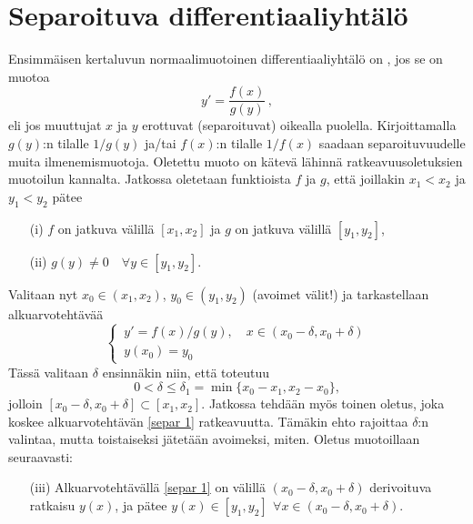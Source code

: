 \section{Separoituva differentiaaliyhtälö} \label{separoituva DY}
\alku
{}

Ensimmäisen kertaluvun normaalimuotoinen differentiaaliyhtälö on , jos se on
muotoa
\[
y'=\frac{f(x)}{g(y)}\,,
\]
eli jos muuttujat $x$ ja $y$ erottuvat (separoituvat) oikealla puolella. Kirjoittamalla $g(y)$:n
tilalle $1/g(y)$ ja/tai $f(x)$:n tilalle $1/f(x)$ saadaan separoituvuudelle muita 
ilmenemismuotoja. Oletettu muoto on kätevä lähinnä ratkeavuusoletuksien muotoilun kannalta.
Jatkossa oletetaan funktioista $f$ ja $g$, että joillakin $x_1<x_2$ ja $y_1<y_2$ pätee
\begin{itemize}
\item[(i)] $f$ on jatkuva välillä $[x_1,x_2]$ ja $g$ on jatkuva välillä $[y_1,y_2]$,
\item[(ii)] $g(y)\neq 0\quad\forall y\in [y_1,y_2]$.
\end{itemize}
Valitaan nyt $x_0\in (x_1,x_2)$, $y_0\in (y_1,y_2)$ (avoimet välit!) ja tarkastellaan 
alkuarvotehtävää
\begin{equation} \label{separ 1}
\begin{cases} 
\,y'=f(x)/g(y), \quad x\in(x_0-\delta,x_0+\delta) \\ \,y(x_0)=y_0
\end{cases} \tag{$\star$}
\end{equation}
Tässä valitaan $\delta$ ensinnäkin niin, että toteutuu
\[
0 < \delta \le \delta_1 = \min \{x_0-x_1,x_2-x_0\},
\]
jolloin $[x_0-\delta,x_0+\delta]\subset [x_1,x_2]$. Jatkossa tehdään myös toinen oletus, joka
koskee alkuarvotehtävän \eqref{separ 1} ratkeavuutta. Tämäkin ehto rajoittaa $\delta$:n
valintaa, mutta toistaiseksi jätetään avoimeksi, miten. Oletus muotoillaan seuraavasti:
\begin{itemize}
\item[(iii)] Alkuarvotehtävällä \eqref{separ 1} on välillä $(x_0-\delta,x_0+\delta)$ 
             derivoituva ratkaisu $y(x)$, ja pätee 
             $y(x)\in[y_1,y_2]\,\ \forall x\in(x_0-\delta,x_0+\delta)$.
\end{itemize}

